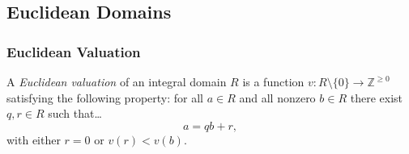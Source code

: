 \subsection{Euclidean Domains}\label{euclideandomains}

\subsubsection{Euclidean Valuation}\label{euclideanvaluation}
A \emph{Euclidean valuation} of an integral domain $R$ is a function $v : R \setminus \{ 0 \} \rightarrow \mathbb{Z}^{\geq 0}$ satisfying the following property:
for all $a \in R$ and all nonzero $b \in R$ there exist $q,r \in R$ such that\dots
$$a = qb + r,$$
with either $r=0$ or $v(r) < v(b)$.